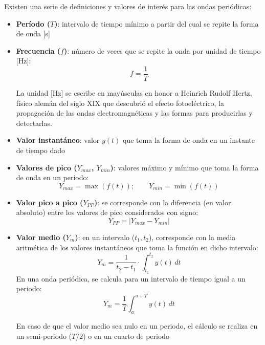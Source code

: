 Existen una serie de definiciones y valores de interés para las ondas
periódicas:
\begin{itemize}
\item \textbf{Período ($T$)}: intervalo de tiempo mínimo a partir del
  cual se repite la forma de onda [s]
\item \textbf{Frecuencia ($f$)}: número de veces que se repite la onda
  por unidad de tiempo [Hz]:
  \begin{equation*}
    f = \dfrac{1}{T}
  \end{equation*}
  \begin{remark}
    La unidad [Hz] se escribe en mayúsculas en honor a Heinrich Rudolf
    Hertz, físico alemán del siglo XIX que descubrió el efecto
    fotoeléctrico, la propagación de las ondas electromagnéticas y las
    formas para producirlas y detectarlas.
  \end{remark}
\item \textbf{Valor instantáneo}: valor $y(t)$ que toma la forma de
  onda en un instante de tiempo dado
\item \textbf{Valores de pico ($Y_{max}$, $Y_{min}$)}: valores máximo
  y mínimo que toma la forma de onda en un periodo:
  \begin{equation*}
    Y_{max} = \max(f(t)); \qquad Y_{min} = \min(f(t))
  \end{equation*}
\item \textbf{Valor pico a pico ($Y_{PP}$)}: se corresponde con la
  diferencia (en valor absoluto) entre los valores de pico
  considerados con signo:
  \begin{equation*}
    Y_{PP}=|Y_{max} - Y_{min}|
  \end{equation*}
\item \textbf{Valor medio ($Y_m$)}: en un intervalo ($t_1,t_2$),
  corresponde con la media aritmética de los valores instantáneos que
  toma la función en dicho intervalo:
  \begin{equation*}
    Y_m=\dfrac{1}{t_2-t_1}\cdot\int_{t_1}^{t_2}y(t)\, dt
  \end{equation*}
  En una onda periódica, se calcula para un intervalo de tiempo igual
  a un periodo:
  \begin{equation}\label{eq.valor_medio}
    \boxed{Y_m=\frac{1}{T}\int_{a}^{a+T}y(t)\, dt}
  \end{equation}
  \begin{remark}
    En caso de que el valor medio sea nulo en un periodo, el cálculo
    se realiza en un semi-periodo ($T/2$) o en un cuarto de periodo

\end{remark}
\end{itemize}
